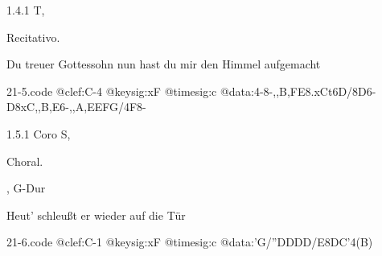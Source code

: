 \documentclass[a4paper, twocolumn, 11pt]{book}
\begin{document}
\newline %
\par 1.4.1  T, \begin{itshape}Recitativo.\end{itshape}\newline \begin{footnotesize} Du treuer Gottessohn nun hast du mir den Himmel aufgemacht \end{footnotesize}  
\begin{filecontents*}{21-5.code}
@clef:C-4
@keysig:xF
@timesig:c
@data:4-8-,,B,FE8.xCt6D/8D6-D8xC,,B,E6-,,A,EEFG/4F8-
\end{filecontents*}

\newline %
\par 1.5.1  Coro S, \begin{itshape}Choral.\end{itshape}, G-Dur\newline \begin{footnotesize} Heut' schleußt er wieder auf die Tür \end{footnotesize}  
\begin{filecontents*}{21-6.code}
@clef:C-1
@keysig:xF
@timesig:c
@data:'G/''DDDD/E{8DC}'4(B)
\end{filecontents*}
\end{document}
